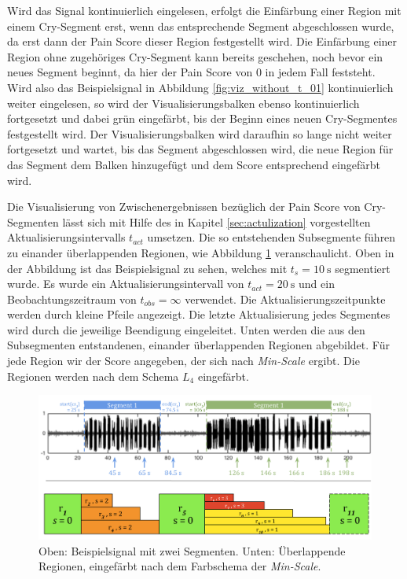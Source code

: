 Wird das Signal kontinuierlich eingelesen, erfolgt die Einfärbung einer Region mit einem Cry-Segment erst, wenn das entsprechende Segment abgeschlossen wurde, da erst dann der Pain Score dieser Region festgestellt wird. Die Einfärbung einer Region ohne zugehöriges Cry-Segment kann bereits geschehen, noch bevor ein neues Segment beginnt, da hier der Pain Score von 0 in jedem Fall feststeht. Wird also das Beispielsignal in Abbildung \ref{fig:viz_without_t_01} kontinuierlich weiter eingelesen, so wird der Visualisierungsbalken ebenso kontinuierlich fortgesetzt und dabei grün eingefärbt, bis der Beginn eines neuen Cry-Segmentes festgestellt wird. Der Visualisierungsbalken wird daraufhin so lange nicht weiter fortgesetzt und \glqq wartet\grqq , bis das Segment abgeschlossen wird, die neue Region für das Segment dem Balken hinzugefügt und dem Score entsprechend eingefärbt wird.
 
Die Visualisierung von \glqq Zwischenergebnissen\grqq{} bezüglich der Pain Score von Cry-Segmenten lässt sich mit Hilfe des in Kapitel \ref{sec:actulization} vorgestellten Aktualisierungsintervalls $t_{act}$ umsetzen. Die so entstehenden Subsegmente führen zu einander überlappenden Regionen, wie Abbildung \ref{fig:viz_multiple_regions} veranschaulicht. Oben in der Abbildung ist das Beispielsignal zu sehen, welches mit $t_s = \SI{10}{\second}$ segmentiert wurde. Es wurde ein Aktualisierungsintervall von  $t_{act} = \SI{20}{\second}$ und ein Beobachtungszeitraum von $t_{obs} = \infty$ verwendet. Die Aktualisierungszeitpunkte werden durch kleine Pfeile angezeigt. Die letzte Aktualisierung jedes Segmentes wird durch die jeweilige Beendigung eingeleitet. Unten werden die aus den Subsegmenten entstandenen, einander überlappenden Regionen abgebildet. Für jede Region wir der Score angegeben, der sich nach \emph{Min-Scale} ergibt. Die Regionen werden nach dem Schema $L_4$ eingefärbt.

\begin{figure}[h]
	\centering
	\includegraphics[width=1\textwidth]{bilder/viz-multiple-regions.png}
	\caption{Oben: Beispielsignal mit zwei Segmenten. Unten: Überlappende Regionen, eingefärbt nach dem Farbschema der \emph{Min-Scale}.}
	\label{fig:viz_multiple_regions}
\end{figure}

